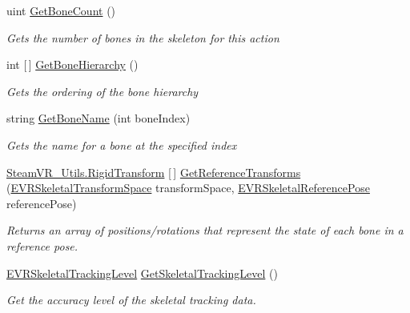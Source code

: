 \begin{DoxyCompactItemize}
uint \mbox{\hyperlink{class_valve_1_1_v_r_1_1_steam_v_r___action___skeleton___source_ae5740f83d6f5c8d12f81037674847d3c}{Get\+Bone\+Count}} ()
\begin{DoxyCompactList}\small\item\em Gets the number of bones in the skeleton for this action \end{DoxyCompactList}\item 
int \mbox{[}$\,$\mbox{]} \mbox{\hyperlink{class_valve_1_1_v_r_1_1_steam_v_r___action___skeleton___source_a7c4f3a37fa7947fc0cb31c131765bd6e}{Get\+Bone\+Hierarchy}} ()
\begin{DoxyCompactList}\small\item\em Gets the ordering of the bone hierarchy \end{DoxyCompactList}\item 
string \mbox{\hyperlink{class_valve_1_1_v_r_1_1_steam_v_r___action___skeleton___source_a0c91ca98beac96d53d38bdcd80238344}{Get\+Bone\+Name}} (int bone\+Index)
\begin{DoxyCompactList}\small\item\em Gets the name for a bone at the specified index \end{DoxyCompactList}\item 
\mbox{\hyperlink{struct_valve_1_1_v_r_1_1_steam_v_r___utils_1_1_rigid_transform}{Steam\+V\+R\+\_\+\+Utils.\+Rigid\+Transform}} \mbox{[}$\,$\mbox{]} \mbox{\hyperlink{class_valve_1_1_v_r_1_1_steam_v_r___action___skeleton___source_ac42e201722ec04380743a0425efa9d1d}{Get\+Reference\+Transforms}} (\mbox{\hyperlink{namespace_valve_1_1_v_r_a916744fb3fc7b8e8ba224fba9bee6de4}{E\+V\+R\+Skeletal\+Transform\+Space}} transform\+Space, \mbox{\hyperlink{namespace_valve_1_1_v_r_a299b655881f873256f035349b59da09e}{E\+V\+R\+Skeletal\+Reference\+Pose}} reference\+Pose)
\begin{DoxyCompactList}\small\item\em Returns an array of positions/rotations that represent the state of each bone in a reference pose. \end{DoxyCompactList}\item 
\mbox{\hyperlink{namespace_valve_1_1_v_r_a6f46bd50fb65255d6537ab32a6bddc30}{E\+V\+R\+Skeletal\+Tracking\+Level}} \mbox{\hyperlink{class_valve_1_1_v_r_1_1_steam_v_r___action___skeleton___source_a4918503e361bba341ae4314a30150088}{Get\+Skeletal\+Tracking\+Level}} ()
\begin{DoxyCompactList}\small\item\em Get the accuracy level of the skeletal tracking data. 


\end{DoxyCompactList}
\end{DoxyCompactItemize}
